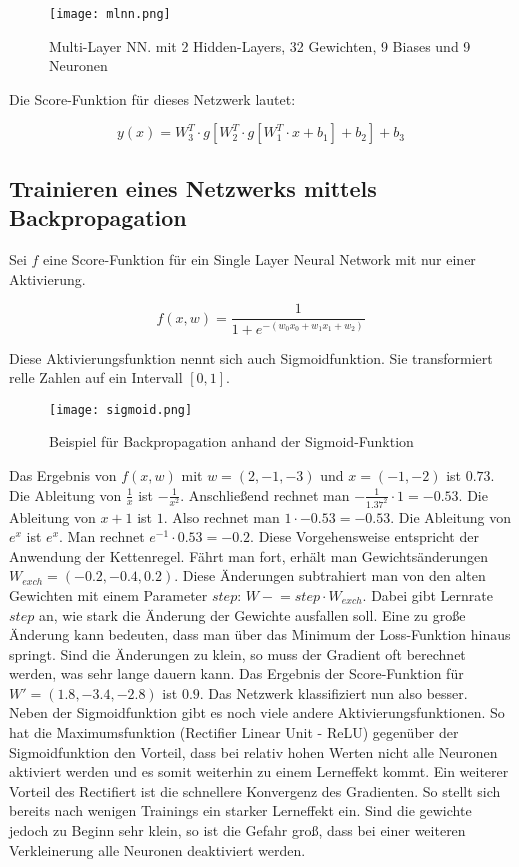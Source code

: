 \documentclass[11pt,fleqn]{book}
\newcommand{\minuseq}{\mathrel{-}=}
\begin{document}
\begin{figure}[h]
\centering
\texttt{[image: mlnn.png]}
\caption{Multi-Layer NN. mit 2 Hidden-Layers, 32 Gewichten, 9 Biases und 9 Neuronen}
\end{figure}

Die Score-Funktion für dieses Netzwerk lautet:

\[y(x) = W_3^T \cdot g[W_2^T \cdot g[W_1^T \cdot x+b_1]+b_2]+b_3\]


\subsection{Trainieren eines Netzwerks mittels Backpropagation}
Sei $f$ eine Score-Funktion für ein Single Layer Neural Network mit nur einer Aktivierung.

\[f(x,w) = \frac{1}{1+e^{-(w_0x_0+w_1x_1+w_2)}}\]

Diese Aktivierungsfunktion nennt sich auch Sigmoidfunktion. Sie transformiert relle Zahlen auf ein Intervall $\left[0, 1\right]$.

\begin{figure}[h]
\centering
\texttt{[image: sigmoid.png]}
\caption{Beispiel für Backpropagation anhand der Sigmoid-Funktion}
\end{figure}

Das Ergebnis von $f(x,w)$ mit $w = (2,-1,-3)$ und $x = (-1,-2)$ ist $0.73$. Die Ableitung von  $\frac{1}{x}$ ist $-\frac{1}{x^2}$. Anschließend rechnet man $-\frac{1}{1.37^2}\cdot 1 = -0.53$. Die Ableitung von $x+1$ ist $1$. Also rechnet man $1\cdot -0.53=-0.53$. Die Ableitung von $e^x$ ist $e^x$. Man rechnet $e^{-1}\cdot 0.53=-0.2$. Diese Vorgehensweise entspricht der Anwendung der Kettenregel. Fährt man fort, erhält man Gewichtsänderungen $W_{exch}=(-0.2,-0.4,0.2)$. Diese Änderungen subtrahiert man von den alten Gewichten mit einem Parameter $step$: $W \minuseq step \cdot W_{exch}$. Dabei gibt Lernrate $step$ an, wie stark die Änderung der Gewichte ausfallen soll. Eine zu große Änderung kann bedeuten, dass man über das Minimum der Loss-Funktion hinaus springt. Sind die Änderungen zu klein, so muss der Gradient oft berechnet werden, was sehr lange dauern kann. Das Ergebnis der Score-Funktion für $W' = (1.8,-3.4,-2.8)$ ist $0.9$. Das Netzwerk klassifiziert nun also besser.\\
\bigskip
Neben der Sigmoidfunktion gibt es noch viele andere Aktivierungsfunktionen. So hat die Maximumsfunktion (Rectifier Linear Unit - ReLU) gegenüber der Sigmoidfunktion den Vorteil, dass bei relativ hohen Werten nicht alle Neuronen aktiviert werden und es somit weiterhin zu einem Lerneffekt kommt. Ein weiterer Vorteil des Rectifiert ist die schnellere Konvergenz des Gradienten. So stellt sich bereits nach wenigen Trainings ein starker Lerneffekt ein. Sind die gewichte jedoch zu Beginn sehr klein, so ist die Gefahr groß, dass bei einer weiteren Verkleinerung alle Neuronen deaktiviert werden.
\end{document}
